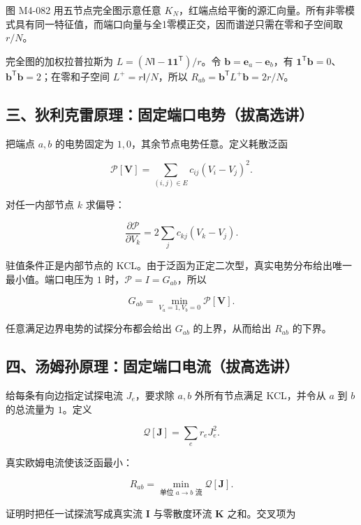 图 M4-082 用五节点完全图示意任意
\(K_N\)，红端点给平衡的源汇向量。所有非零模式具有同一特征值，而端口向量与全1零模正交，因而谱逆只需在零和子空间取
\(r/N\)。

完全图的加权拉普拉斯为
\(L=(N\mathsf I-\mathbf1\mathbf1^{\mathsf T})/r\)。令
\(\boldsymbol b=\boldsymbol e_a-\boldsymbol e_b\)，有
\(\mathbf1^{\mathsf T}\boldsymbol b=0\)、\(\boldsymbol b^{\mathsf T}\boldsymbol b=2\)；在零和子空间
\(L^+=r\mathsf I/N\)，所以
\(R_{ab}=\boldsymbol b^{\mathsf T}L^+\boldsymbol b=2r/N\)。

\subsection{三、狄利克雷原理：固定端口电势（拔高选讲）}\label{m4:ux4e09ux72c4ux5229ux514bux96f7ux539fux7406ux56faux5b9aux7aefux53e3ux7535ux52bfux62d4ux9ad8ux9009ux8bb2}

把端点 \(a,b\) 的电势固定为 \(1,0\)，其余节点电势任意。定义耗散泛函

\[
\mathcal P[\boldsymbol V]
=\sum_{(i,j)\in E}c_{ij}(V_i-V_j)^2.
\]

对任一内部节点 \(k\) 求偏导：

\[
\frac{\partial\mathcal P}{\partial V_k}
=2\sum_jc_{kj}(V_k-V_j).
\]

驻值条件正是内部节点的
KCL。由于泛函为正定二次型，真实电势分布给出唯一最小值。端口电压为 \(1\)
时，\(\mathcal P=I=G_{ab}\)，所以

\[
\boxed{
G_{ab}=\min_{V_a=1,V_b=0}\mathcal P[\boldsymbol V]
}.
\]

任意满足边界电势的试探分布都会给出 \(G_{ab}\) 的上界，从而给出
\(R_{ab}\) 的下界。

\subsection{四、汤姆孙原理：固定端口电流（拔高选讲）}\label{m4:ux56dbux6c64ux59c6ux5b59ux539fux7406ux56faux5b9aux7aefux53e3ux7535ux6d41ux62d4ux9ad8ux9009ux8bb2}

给每条有向边指定试探电流 \(J_e\)，要求除 \(a,b\) 外所有节点满足
KCL，并令从 \(a\) 到 \(b\) 的总流量为 \(1\)。定义

\[
\mathcal Q[\boldsymbol J]
=\sum_er_eJ_e^2.
\]

真实欧姆电流使该泛函最小：

\[
\boxed{
R_{ab}=\min_{\text{单位 }a\to b\text{ 流}}\mathcal Q[\boldsymbol J]
}.
\]

证明时把任一试探流写成真实流 \(\boldsymbol I\) 与零散度环流
\(\boldsymbol K\) 之和。交叉项为

